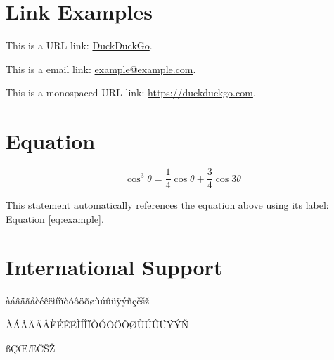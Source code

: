 \documentclass[
	a4paper, %
	12pt, %
]{CSSullivanBusinessReport}
\begin{document}

\section{Link Examples}

This is a URL link: \href{https://www.duckduckgo.com}{DuckDuckGo}.

This is a email link: \href{mailto:example@example.com}{example@example.com}.

This is a monospaced URL link: \url{https://duckduckgo.com}.


\section{Equation}

\begin{equation}
	\cos^3 \theta =\frac{1}{4}\cos\theta+\frac{3}{4}\cos 3\theta
	\label{eq:example}
\end{equation}

This statement automatically references the equation above using its label: Equation \ref{eq:example}.


\section{International Support}

àáâäãåèéêëìíîïòóôöõøùúûüÿýñçčšž

ÀÁÂÄÃÅÈÉÊËÌÍÎÏÒÓÔÖÕØÙÚÛÜŸÝÑ

ßÇŒÆČŠŽ

\end{document}
